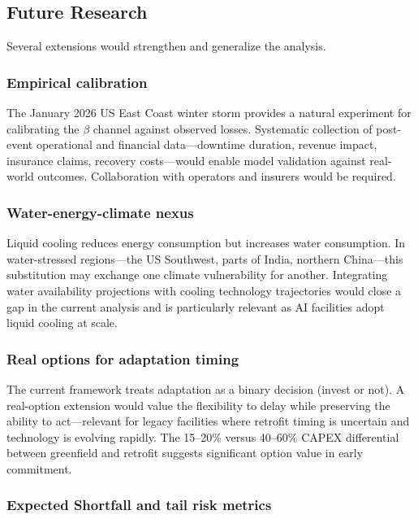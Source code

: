 \subsection*{Future Research}\label{toc:future}
\greensep

\begin{twocolbody}

\noindent Several extensions would strengthen and generalize the analysis.

\subsubsection*{Empirical calibration}

The January 2026 US East Coast winter storm provides a natural experiment for calibrating the $\beta$ channel against observed losses. Systematic collection of post-event operational and financial data---downtime duration, revenue impact, insurance claims, recovery costs---would enable model validation against real-world outcomes. Collaboration with operators and insurers would be required.

\subsubsection*{Water-energy-climate nexus}

Liquid cooling reduces energy consumption but increases water consumption. In water-stressed regions---the US Southwest, parts of India, northern China---this substitution may exchange one climate vulnerability for another. Integrating water availability projections with cooling technology trajectories would close a gap in the current analysis and is particularly relevant as AI facilities adopt liquid cooling at scale.

\subsubsection*{Real options for adaptation timing}

The current framework treats adaptation as a binary decision (invest or not). A real-option extension would value the flexibility to delay while preserving the ability to act---relevant for legacy facilities where retrofit timing is uncertain and technology is evolving rapidly. The 15--20\% versus 40--60\% CAPEX differential between greenfield and retrofit suggests significant option value in early commitment.

\subsubsection*{Expected Shortfall and tail risk metrics}


\end{twocolbody}
